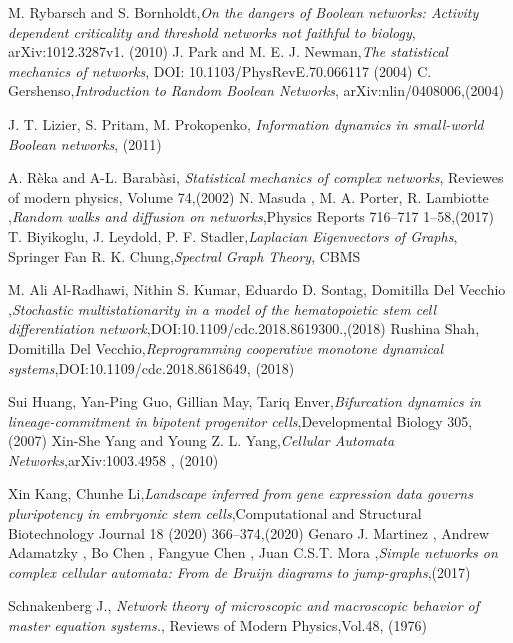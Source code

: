\begin{thebibliography}{90}
 M. Rybarsch and S. Bornholdt,\emph{On the dangers of Boolean networks:
Activity dependent criticality and threshold networks not faithful to biology}, arXiv:1012.3287v1. (2010)
 J. Park and M. E. J. Newman,\emph{The statistical mechanics of networks}, DOI: 10.1103/PhysRevE.70.066117 (2004)
 C. Gershenso,\emph{Introduction to Random Boolean Networks}, arXiv:nlin/0408006,(2004)


 J. T. Lizier, S. Pritam, M. Prokopenko, \emph{Information dynamics in small-world Boolean networks}, (2011)

 A. Rèka and A-L. Barabàsi, \emph{Statistical mechanics of complex networks}, Reviewes of modern physics, Volume 74,(2002)
 N. Masuda , M. A. Porter, R. Lambiotte ,\emph{Random walks and diffusion on networks},Physics Reports 716–717 1–58,(2017)
 T. Biyikoglu, J. Leydold, P. F. Stadler,\emph{Laplacian Eigenvectors of Graphs}, Springer
 Fan R. K. Chung,\emph{Spectral Graph Theory}, CBMS

 M. Ali Al-Radhawi, Nithin S. Kumar, Eduardo D. Sontag, Domitilla Del Vecchio ,\emph{Stochastic multistationarity in a model of the hematopoietic
stem cell differentiation network},DOI:10.1109/cdc.2018.8619300.,(2018)
 Rushina Shah, Domitilla Del Vecchio,\emph{Reprogramming cooperative monotone dynamical systems},DOI:10.1109/cdc.2018.8618649, (2018)

 Sui Huang, Yan-Ping Guo, Gillian May, Tariq Enver,\emph{Bifurcation dynamics in lineage-commitment in bipotent progenitor cells},Developmental Biology 305, (2007)
 Xin-She Yang and Young Z. L. Yang,\emph{Cellular Automata Networks},arXiv:1003.4958 , (2010)

 Xin Kang, Chunhe Li,\emph{Landscape inferred from gene expression data governs pluripotency in
embryonic stem cells},Computational and Structural Biotechnology Journal 18 (2020) 366–374,(2020)
 Genaro J. Martinez , Andrew Adamatzky  ,
Bo Chen , Fangyue Chen , Juan C.S.T. Mora ,\emph{Simple networks on complex cellular automata:
From de Bruijn diagrams to jump-graphs},(2017)



 Schnakenberg J., \emph{Network theory of microscopic and macroscopic behavior of master equation systems.}, Reviews of Modern Physics,Vol.48, (1976)



\end{thebibliography}
\clearpage{\pagestyle{empty}\cleardoublepage}

